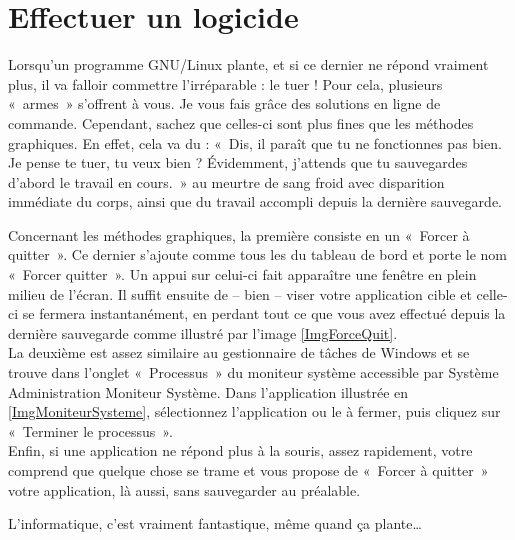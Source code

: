 \section{Effectuer un logicide}
\label{RefTuerProcessus}
Lorsqu'un programme GNU/Linux plante, et si ce dernier ne répond vraiment plus, il va falloir commettre l'irréparable : le tuer ! Pour cela, plusieurs «~armes~» s'offrent à vous. Je vous fais grâce des solutions en ligne de commande. Cependant, sachez que celles-ci sont plus fines que les méthodes graphiques. En effet, cela va du : «~Dis, il paraît que tu ne fonctionnes pas bien. Je pense te tuer, tu veux bien ? Évidemment, j'attends que tu sauvegardes d'abord le travail en cours.~» au meurtre de sang froid avec disparition immédiate du corps, ainsi que du travail accompli depuis la dernière sauvegarde.\par
\ForcerTuer
Concernant les méthodes graphiques, la première consiste en un  «~Forcer à quitter~». Ce dernier s'ajoute comme tous les  du tableau de bord et porte le nom «~Forcer quitter~». Un appui sur celui-ci fait apparaître une fenêtre en plein milieu de l'écran. Il suffit ensuite de -- bien -- viser votre application cible et celle-ci se fermera instantanément, en perdant tout ce que vous avez effectué depuis la dernière sauvegarde comme illustré par l'image \ref{ImgForceQuit}.\\
La deuxième est assez similaire au gestionnaire de tâches de Windows et se trouve dans l'onglet «~Processus~» du moniteur système accessible par Système \FlecheDroite Administration \FlecheDroite Moniteur Système. Dans l'application illustrée en \ref{ImgMoniteurSysteme}, sélectionnez l'application ou le  à fermer, puis cliquez sur «~Terminer le processus~».\\
Enfin, si une application ne répond plus à la souris, assez rapidement, votre  comprend que quelque chose se trame et vous propose de «~Forcer à quitter~» votre application, là aussi, sans sauvegarder au préalable.\par
L'informatique, c'est vraiment fantastique, même quand ça plante\ldots{}

